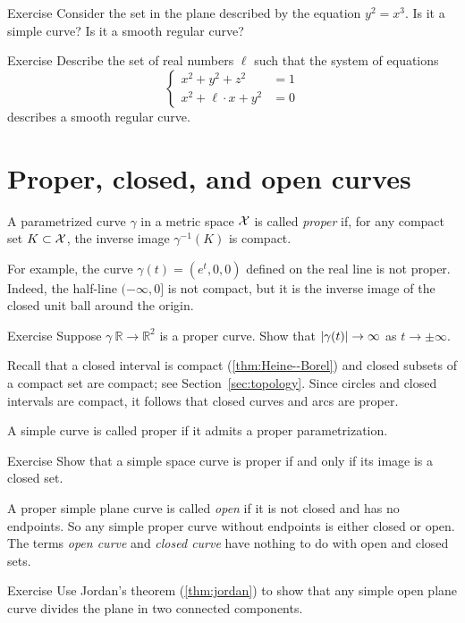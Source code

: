 \begin{thm}{Exercise}\label{ex:y^2=x^3}
Consider the set in the plane described by the equation
$y^2=x^3$.
Is it a simple curve?
Is it a smooth regular curve?
\end{thm}

\begin{thm}{Exercise}\label{ex:viviani}
Describe the set of real numbers $\ell$
such that the system of equations
\[\begin{cases}
x^2+y^2+z^2&=1
\\
x^2+\ell\cdot x+y^2&=0
\end{cases}\]
describes a smooth regular curve.
\end{thm}

\section{Proper, closed, and open curves}\label{sec:proper-curves}

A parametrized curve $\gamma$ in a metric space $\mathcal{X}$ is called \emph{proper} if, for any compact set $K \subset \mathcal{X}$, the inverse image $\gamma^{-1}(K)$ is compact.

For example, the curve $\gamma(t)=(e^t,0,0)$ defined on the real line is not proper.
Indeed, the half-line $(-\infty,0]$ is not compact, but it is the inverse image of the closed unit ball around the origin.

\begin{thm}{Exercise}\label{ex:open-curve}
Suppose $\gamma\:\mathbb{R}\to\mathbb{R}^2$ is a proper curve.
Show that  $|\gamma(t)|\z\to\infty$ as $t\to\pm\infty$.
\end{thm}


Recall that a closed interval is compact (\ref{thm:Heine--Borel}) and closed subsets of a compact set are compact;
see Section~\ref{sec:topology}.
Since circles and closed intervals are compact,
it follows that closed curves and arcs are proper.

A simple curve is called proper if it admits a proper parametrization.

\begin{thm}{Exercise}\label{ex:proper-closed}
Show that a simple space curve is proper if and only if its image is a closed set.

\end{thm}

A proper simple plane curve is called \emph{open} if it is not closed and has no endpoints.
So any simple proper curve without endpoints is either closed or open.
The terms {}\emph{open curve} and {}\emph{closed curve} have nothing to do with open and closed sets.

\begin{thm}{Exercise}\label{ex:proper-curve}
Use Jordan's theorem (\ref{thm:jordan}) to show that any simple open plane curve divides the plane in two connected components.  
\end{thm}



